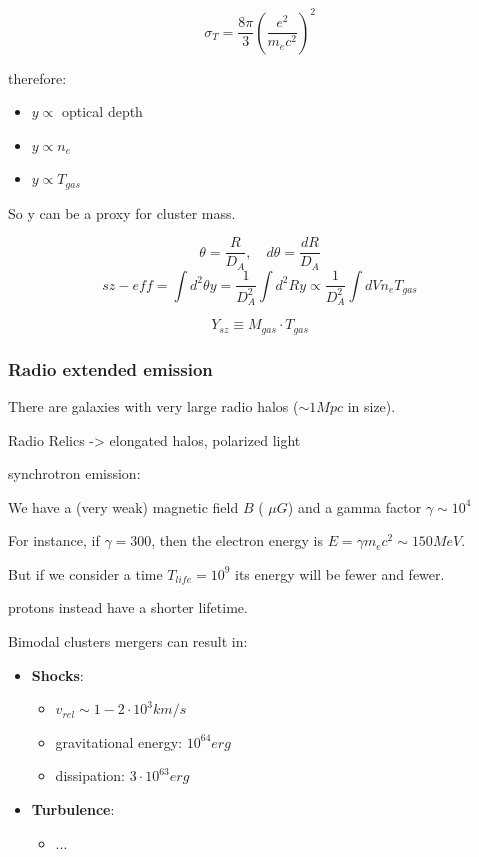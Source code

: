 $$
\sigma_T = \dfrac{8 \pi}{3} \left( \dfrac{e^2}{m_e c^2} \right)^2
$$

therefore:
\begin{itemize}
    \item $y \propto$ optical depth
    \item $y \propto n_e$ 
    \item $y \propto T_{gas}$ 
\end{itemize}

So y can be a proxy for cluster mass.

$$
\theta = \dfrac R{D_A}, \quad d\theta = \dfrac{dR}{D_A}
$$
$$
sz-eff = \int d^2 \theta y = \dfrac 1{D_A^2} \int d^2 Ry \propto \dfrac 1{D_A^2} \int dV n_e T_{gas}
$$

$$
Y_{sz} \equiv M_{gas} \cdot T_{gas}
$$

\subsubsection{Radio extended emission}

There are galaxies with very large radio halos ($\sim 1 Mpc$ in size).

Radio Relics -> elongated halos, polarized light

synchrotron emission:

We have a (very weak) magnetic field $B$ ( $\mu G$) and a gamma factor $\gamma \sim 10^4$


For instance, if $\gamma = 300$, then the electron energy is $E = \gamma m_e c^2 \sim 150 MeV$.

But if we consider a time $T_{life} = 10^9$ its energy will be fewer and fewer.

protons instead have a shorter lifetime. 

Bimodal clusters mergers can result in:
\begin{itemize}
    \item \textbf{Shocks}: 
    \begin{itemize} 
        \item $v_{rel} \sim 1-2 \cdot 10^3 km/s$
        \item gravitational energy: $10^64 erg$
        \item dissipation: $3 \cdot 10^63 erg$
    \end{itemize}

    \item \textbf{Turbulence}:
    \begin{itemize}
        \item ...
    \end{itemize}
\end{itemize}

